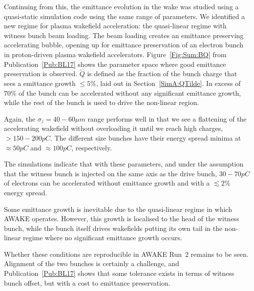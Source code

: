 Continuing from this, the emittance evolution in the wake was studied using a quasi-static simulation code using the same range of parameters.
We identified a new regime for plasma wakefield acceleration: the quasi-linear regime with witness bunch beam loading.
The beam loading creates an emittance preserving accelerating bubble, opening up for emittance preservation of an electron bunch in proton-driven plasma wakefield accelerators.
Figure~\ref{Fig:Sum:BQ} from Publication~\ref{Pub:BL17} shows the parameter space where good emittance preservation is observed.
$\tilde{Q}$ is defined as the fraction of the bunch charge that sees a emittance growth $\leq 5\%$, laid out in Section~\ref{SimA:QTilde}.
In excess of $70\%$ of the bunch can be accelerated without any significant emittance growth, while the rest of the bunch is used to drive the non-linear region.

Again, the $\sigma_z = 40-60\unit{\mu m}$ range performs well in that we see a flattening of the accelerating wakefield without overloading it until we reach high charges, $> 150-200\unit{pC}$.
The different size bunches have their energy spread minima at $\approx 50\unit{pC}$ and $\approx 100\unit{pC}$, respectively.

The simulations indicate that with these parameters, and under the assumption that the witness bunch is injected on the same axis as the drive bunch, $30-70\unit{pC}$ of electrons can be accelerated without emittance growth and with a $\lesssim 2\%$ energy spread.

Some emittance growth is inevitable due to the quasi-linear regime in which AWAKE operates.
However, this growth is localised to the head of the witness bunch, while the bunch itself drives wakefields putting its own tail in the non-linear regime where no significant emittance growth occurs.

Whether these conditions are reproducible in AWAKE Run~2 remains to be seen.
Alignment of the two bunches is certainly a challenge, and Publication~\ref{Pub:BL17} shows that some tolerance exists in terms of witness bunch offset, but with a cost to emittance preservation.
